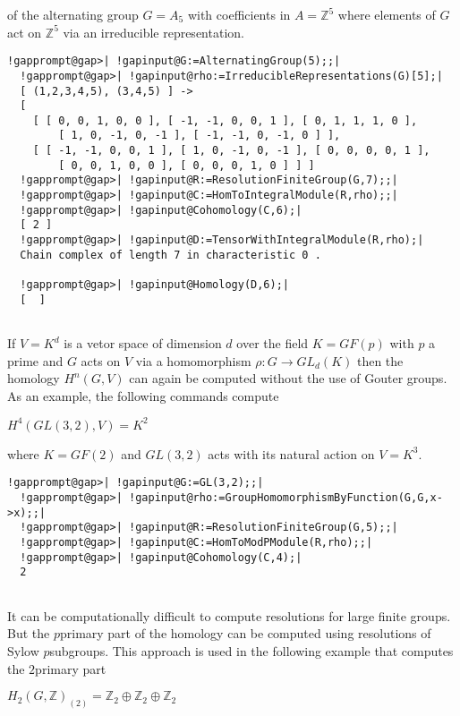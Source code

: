 \documentclass[a4paper,11pt]{report}
\begin{document}
{{ of the alternating group $G=A_5$ with coefficients in $A=\mathbb Z^5$ where elements of $G$ act on $\mathbb Z^5$ via an irreducible representation. 
\begin{Verbatim}[commandchars=!@|,fontsize=\small,frame=single,label=Example]
  !gapprompt@gap>| !gapinput@G:=AlternatingGroup(5);;|
  !gapprompt@gap>| !gapinput@rho:=IrreducibleRepresentations(G)[5];|
  [ (1,2,3,4,5), (3,4,5) ] -> 
  [ 
    [ [ 0, 0, 1, 0, 0 ], [ -1, -1, 0, 0, 1 ], [ 0, 1, 1, 1, 0 ], 
        [ 1, 0, -1, 0, -1 ], [ -1, -1, 0, -1, 0 ] ], 
    [ [ -1, -1, 0, 0, 1 ], [ 1, 0, -1, 0, -1 ], [ 0, 0, 0, 0, 1 ], 
        [ 0, 0, 1, 0, 0 ], [ 0, 0, 0, 1, 0 ] ] ]
  !gapprompt@gap>| !gapinput@R:=ResolutionFiniteGroup(G,7);;|
  !gapprompt@gap>| !gapinput@C:=HomToIntegralModule(R,rho);;|
  !gapprompt@gap>| !gapinput@Cohomology(C,6);|
  [ 2 ]
  !gapprompt@gap>| !gapinput@D:=TensorWithIntegralModule(R,rho);|
  Chain complex of length 7 in characteristic 0 . 
  
  !gapprompt@gap>| !gapinput@Homology(D,6);|
  [  ]
  
\end{Verbatim}
 

If $V=K^d$ is a vetor space of dimension $d$ over the field $K=GF(p)$ with $p$ a prime and $G$ acts on $V$ via a homomorphism $\rho\colon G\rightarrow GL_d(K)$ then the homology $H^n(G,V)$ can again be computed without the use of G\texttt{}outer groups. As
an example, the following commands compute 

$H^4(GL(3,2),V) =K^2$ 

where $K=GF(2)$ and $GL(3,2)$ acts with its natural action on $V=K^3$. 
\begin{Verbatim}[commandchars=!@|,fontsize=\small,frame=single,label=Example]
  !gapprompt@gap>| !gapinput@G:=GL(3,2);;|
  !gapprompt@gap>| !gapinput@rho:=GroupHomomorphismByFunction(G,G,x->x);;|
  !gapprompt@gap>| !gapinput@R:=ResolutionFiniteGroup(G,5);;|
  !gapprompt@gap>| !gapinput@C:=HomToModPModule(R,rho);;|
  !gapprompt@gap>| !gapinput@Cohomology(C,4);|
  2
  
\end{Verbatim}
 

 It can be computationally difficult to compute resolutions for large finite
groups. But the $p$\texttt{}primary part of the homology can be computed using
resolutions of Sylow $p$\texttt{}subgroups. This approach is used in the following example
that computes the $2$\texttt{}primary part 

$H_{2}(G,\mathbb Z)_{(2)} = \mathbb Z_2 \oplus \mathbb Z_2\oplus \mathbb Z_2$ 

}}
\end{document}
